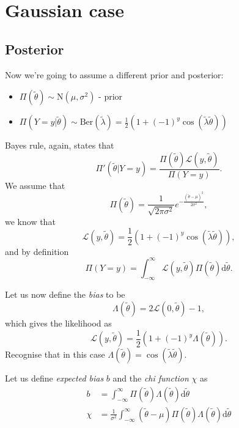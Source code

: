 \documentclass[]{report}
\begin{document}
\section{Gaussian case}

\subsection{Posterior}
Now we're going to assume a different prior and posterior:

\begin{itemize}
	\item $\Pi(\tilde{\theta}) \sim \text{N}(\mu, \sigma^2)$ - prior
	\item $\Pi(Y=y | \tilde{\theta}) \sim \text{Ber}(\tilde{\lambda}) = \frac{1}{2}(1 + (-1)^{y} \cos(\tilde{\lambda} \tilde{\theta}))$
\end{itemize}
Bayes rule, again, states that
\begin{equation}
    \Pi'(\tilde{\theta}|Y = y) = \frac{\Pi(\tilde{\theta}) \mathcal{L} (y, \tilde{\theta})}{\Pi(Y=y)}.
\end{equation}
We assume that
\begin{equation}
    \Pi(\tilde{\theta}) = \frac{1}{\sqrt{2\pi \sigma^2}} e^{-\frac{(\tilde{\theta} - \mu)^2}{2\sigma^2}},
\end{equation}
we know that
\begin{equation}
    \mathcal{L} (y, \tilde{\theta}) = \frac{1}{2}(1 + (-1)^{y} \cos(\tilde{\lambda} \tilde{\theta})),
\end{equation}
and by definition
\begin{equation}
\label{eq:normalisation-factor}
    \Pi(Y=y) = \int_{-\infty}^{\infty} \mathcal{L}(y, \tilde{\theta}) \Pi(\tilde{\theta}) \text{d}\tilde{\theta}.
\end{equation}

Let us now define the \textit{bias} to be
\begin{equation}
    \Lambda ( \tilde{\theta}) = 2 \mathcal{L} (0, \tilde{\theta}) - 1,
\end{equation}
which gives the likelihood as
\begin{equation}
    \mathcal{L} (y, \tilde{\theta}) = \frac{1}{2}(1 + (-1)^{y} \Lambda(\tilde{\theta})).
\end{equation}
Recognise that in this case $\Lambda(\tilde{\theta}) = \cos(\tilde{\lambda} \tilde{\theta})$.


Let us define \textit{expected bias} $b$ and the \textit{chi function} $\chi$ as
\begin{align}
\label{eq:b}
    b &= \int_{-\infty}^{\infty} \Pi(\tilde{\theta}) \Lambda (\tilde{\theta}) \text{d} \tilde{\theta}\\
\label{eq:chi}
    \chi &= \frac{1}{\sigma^2} \int_{-\infty}^{\infty} (\tilde{\theta} - \mu)\Pi(\tilde{\theta}) \Lambda (\tilde{\theta}) \text{d} \tilde{\theta}
\end{align}
\end{document}
